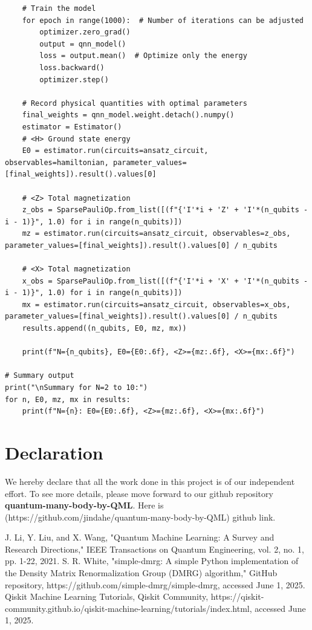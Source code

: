 \documentclass[pre,twocolumn,floatfix]{revtex4-1}
\begin{document}
\begin{lstlisting}
    # Train the model
    for epoch in range(1000):  # Number of iterations can be adjusted
        optimizer.zero_grad()
        output = qnn_model()
        loss = output.mean()  # Optimize only the energy
        loss.backward()
        optimizer.step()

    # Record physical quantities with optimal parameters
    final_weights = qnn_model.weight.detach().numpy()
    estimator = Estimator()
    # <H> Ground state energy
    E0 = estimator.run(circuits=ansatz_circuit, observables=hamiltonian, parameter_values=[final_weights]).result().values[0]

    # <Z> Total magnetization
    z_obs = SparsePauliOp.from_list([(f"{'I'*i + 'Z' + 'I'*(n_qubits - i - 1)}", 1.0) for i in range(n_qubits)])
    mz = estimator.run(circuits=ansatz_circuit, observables=z_obs, parameter_values=[final_weights]).result().values[0] / n_qubits

    # <X> Total magnetization
    x_obs = SparsePauliOp.from_list([(f"{'I'*i + 'X' + 'I'*(n_qubits - i - 1)}", 1.0) for i in range(n_qubits)])
    mx = estimator.run(circuits=ansatz_circuit, observables=x_obs, parameter_values=[final_weights]).result().values[0] / n_qubits
    results.append((n_qubits, E0, mz, mx))
    
    print(f"N={n_qubits}, E0={E0:.6f}, <Z>={mz:.6f}, <X>={mx:.6f}")

# Summary output
print("\nSummary for N=2 to 10:")
for n, E0, mz, mx in results:
    print(f"N={n}: E0={E0:.6f}, <Z>={mz:.6f}, <X>={mx:.6f}")
\end{lstlisting}

\section{Declaration}
We hereby declare that all the work done in this project is of our independent effort. To see more details, please move forward to our github repository \textbf{quantum-many-body-by-QML}. Here is (https://github.com/jindahe/quantum-many-body-by-QML) github link.
\begin{thebibliography}{99}
    J. Li, Y. Liu, and X. Wang, "Quantum Machine Learning: A Survey and Research Directions," IEEE Transactions on Quantum Engineering, vol. 2, no. 1, pp. 1-22, 2021.  
    S. R. White, "simple-dmrg: A simple Python implementation of the Density Matrix Renormalization Group (DMRG) algorithm," GitHub repository, https://github.com/simple-dmrg/simple-dmrg, accessed June 1, 2025.
    Qiskit Machine Learning Tutorials, Qiskit Community, https://qiskit-community.github.io/qiskit-machine-learning/tutorials/index.html, accessed June 1, 2025.

\end{thebibliography}
\end{document}
